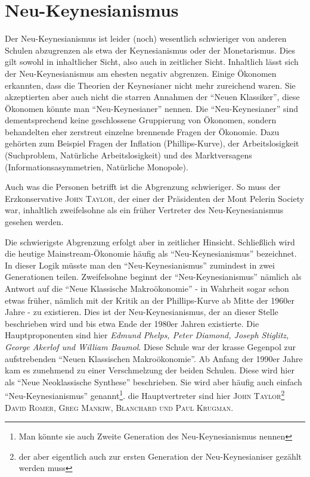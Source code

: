 %
%
%

\chapter{Neu-Keynesianismus} \label{cha: Neu Keynes}

Der Neu-Keynesianismus ist leider (noch) wesentlich schwieriger von anderen Schulen abzugrenzen als etwa der Keynesianismus oder der Monetarismus. Dies gilt sowohl in inhaltlicher Sicht, also auch in zeitlicher Sicht. Inhaltlich lässt sich der Neu-Keynesianismus am ehesten negativ abgrenzen. Einige Ökonomen erkannten, dass die Theorien der Keynesianer nicht mehr zureichend waren. Sie akzeptierten aber auch nicht die starren Annahmen der "`Neuen Klassiker"', diese Ökonomen könnte man "`Neu-Keynesianer"' nennen. Die "`Neu-Keynesianer"' sind dementsprechend keine geschlossene Gruppierung von Ökonomen, sondern behandelten eher zerstreut einzelne brennende Fragen der Ökonomie. Dazu gehörten zum Beispiel Fragen der Inflation (Phillips-Kurve), der Arbeitslosigkeit (Suchproblem, Natürliche Arbeitslosigkeit) und des Marktversagens (Informationsasymmetrien, Natürliche Monopole). 

Auch was die Personen betrifft ist die Abgrenzung schwieriger. So muss der Erzkonservative \textsc{John Taylor}, der einer der Präsidenten der Mont Pelerin Society war, inhaltlich zweifelsohne als ein früher Vertreter des Neu-Keynesianismus gesehen werden. 

Die schwierigste Abgrenzung erfolgt aber in zeitlicher Hinsicht. Schließlich wird die heutige Mainstream-Ökonomie häufig als "`Neu-Keynesianismus"' bezeichnet. In dieser Logik müsste man den "`Neu-Keynesianismus"' zumindest in zwei Generationen teilen. Zweifelsohne beginnt der "`Neu-Keynesianismus"' nämlich als Antwort auf die "`Neue Klassische Makroökonomie"' - in Wahrheit  sogar schon etwas früher, nämlich mit der Kritik an der Phillips-Kurve ab Mitte der 1960er Jahre - zu existieren. Dies ist der Neu-Keynesianismus, der an dieser Stelle beschrieben wird und bis etwa Ende der 1980er Jahren existierte. Die Hauptproponenten sind hier \textit{Edmund Phelps, Peter Diamond, Joseph Stiglitz, George Akerlof und William Baumol}. Diese Schule war der krasse Gegenpol zur aufstrebenden "`Neuen Klassischen Makroökonomie"'.
Ab Anfang der 1990er Jahre kam es zunehmend zu einer Verschmelzung der beiden Schulen. Diese wird hier als "`Neue Neoklassische Synthese"' beschrieben. Sie wird aber häufig auch einfach "`Neu-Keynesianismus"' genannt\footnote{Man könnte sie auch Zweite Generation des Neu-Keynesianismus nennen}. die Hauptvertreter sind hier \textsc{John Taylor}\footnote{der aber eigentlich auch zur ersten Generation der Neu-Keynesianiser gezählt werden muss} \textsc{David Romer, Greg Mankiw, Blanchard und Paul Krugman}.

